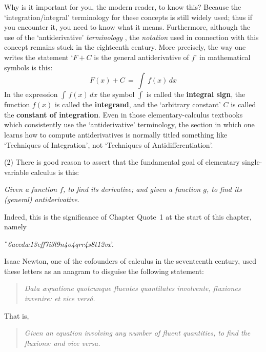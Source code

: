 {        Why is it important for you, the modern reader, to know this? Because the `integration/integral' terminology for these concepts is still widely used;
    thus if you encounter it, you need to know what it means. Furthermore, although the use of the `antiderivative' {\em terminology} ,
    the {\em notation} used in connection with this concept remains stuck in the eighteenth century.
    More precisely, the way one writes the statement `$F+C$ is the general antiderivative of $f$' in mathematical symbols is this:
        \begin{displaymath}
        F(x)+C \,=\, \int\, f(x)\,dx
        \end{displaymath}
    In the expression ${\displaystyle \int\, f(x)\,dx}$ the symbol ${\displaystyle \int}$ is called the {\bf integral sign},
    the function $f(x)$ is called the {\bf integrand}, and the `arbitrary constant' $C$ is called the {\bf constant of integration}.
    Even in those elementary-calculus textbooks which consistently use the `antiderivative' terminology,
     the section in which one learns how to compute antiderivatives is normally titled something like `Techniques of Integration',
    not `Techniques of Antidifferentiation'.

\V

        (2) There is good reason to assert that the fundamental goal of elementary single-variable calculus is this:

\VA

    \h {\em Given a function $f$, to find its derivative;
    and given a function $g$, to find its (general) antiderivative.}

\VA

\noindent Indeed, this is the significance of Chapter Quote~{1} at the start of this chapter, namely 

\VA

        \h `{\em 6accd{\ae}13eff7i3l9n4o4qrr4s8t12vx}'.

\VA

\noindent Isaac Newton, one of the cofounders of calculus in the seventeenth century, used these letters as an anagram to disguise the following statement:

\begin{quotation}
{\footnotesize
      {\em Data {\ae}quatione quotcunque fluentes quantitates involvente, fluxiones invenire: et vice vers\^{a}}.
}%
\end{quotation}

    That is,
\begin{quotation}
{\footnotesize 
    \em Given an equation involving any number of fluent quantities, to find the fluxions: and vice versa.
}%
\end{quotation}

}
